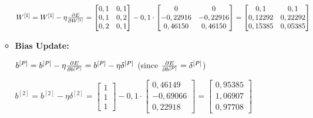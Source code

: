 \documentclass[12pt]{article}
\begin{document}
\begin{enumerate}[leftmargin=\labelsep, label=\textbf{\arabic*.)}]
\begin{itemize}
\begin{center}
                        $W^{[1]} = W^{[1]} - \eta \pdv{E}{W^{[1]}} = \begin{bmatrix}
                                0,1 & 0,1 \\
                                0,1 & 0,2 \\
                                0,2 & 0,1
                            \end{bmatrix} - 0,1 \cdot \begin{bmatrix}
                                0        & 0        \\
                                -0,22916 & -0,22916 \\
                                0,46150  & 0,46150
                            \end{bmatrix} = \begin{bmatrix}
                                0,1     & 0,1     \\
                                0,12292 & 0,22292 \\
                                0,15385 & 0,05385
                            \end{bmatrix}$
                        \vspace{0.25cm}

                    \end{center}
              \item \textbf{Bias Update:}
                    \begin{center}
                        \vspace{0.25cm}

                        $b^{[P]} = b^{[P]} - \eta \pdv{E}{b^{[P]}} = b^{[P]} - \eta \delta^{[P]}$ (since $\pdv{E}{b^{[P]}} = \delta^{[P]}$)

                        \vspace{0.5em}

                        $b^{[2]} = b^{[2]} - \eta \delta^{[2]} = \begin{bmatrix}
                                1 \\
                                1 \\
                                1
                            \end{bmatrix} - 0,1 \cdot \begin{bmatrix}
                                0,46149  \\
                                -0,69066 \\
                                0,22918
                            \end{bmatrix} = \begin{bmatrix}
                                0,95385 \\
                                1,06907 \\
                                0,97708
                            \end{bmatrix}$


\end{center}
\end{itemize}
\end{enumerate}
\end{document}
